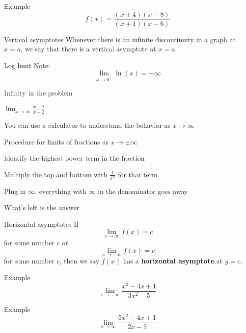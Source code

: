 \documentclass[t]{beamer}
\newenvironment{fpi}
  {\itemize[nolistsep,itemsep=\fill]}
  {\vfill\enditemize}
\begin{document}
\begin{frame}{Example}
$$f(x) = \frac{(x+4)(x-8)}{(x+1)(x-6)}$$
\end{frame}

\begin{frame}{Vertical asymptotes}
Whenever there is an infinite discontinuity in a graph at $x=a$, we
say that there is a vertical asymptote at $x=a$.
\end{frame}

\begin{frame}{Log limit}
Note: 
$$ \lim_{x \to 0^+} \ln(x) = -\infty $$
\end{frame}

\begin{frame}{Infinity in the problem}
\begin{fpi}
\item $ \displaystyle \lim_{x \to \infty} \frac{x+1}{x-2}$
\item You can use a calculator to understand the behavior as $x \to \infty$
\end{fpi}
\end{frame}

\begin{frame}{Procedure for limits of fractions as $x \to \pm \infty$}
\begin{fpi}
\item Identify the highest power term in the fraction
\item Multiply the top and bottom with $\frac{1}{x^n}$ for that term
\item Plug in $\infty$, everything with $\infty$ in the denominator goes away
\item What's left is the answer
\end{fpi}
\end{frame}

\begin{frame}{Horizontal asymptotes}
If $$\lim_{x \to \infty} f(x) = c$$ for some number $c$
or $$\lim_{x \to -\infty} f(x) = c$$ for some number $c$,
then we say $f(x)$ has a \textbf{horizontal asymptote} at
$y = c$.
\end{frame}

\begin{frame}{Example}
$$\lim_{x \to -\infty} \frac{x^2 -4x +1}{3x^2 -5}$$
\end{frame}

\begin{frame}{Example}
$$\lim_{x \to \infty} \frac{5x^2 - 4x +1}{2x -5}$$
\end{frame}
\end{document}
